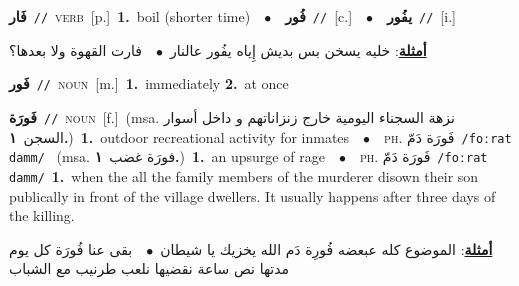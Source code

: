 \documentclass[10pt,a4paper,twoside]{article} %
\begin{document}
\begin{multicols}{2}
{\setlength\topsep{0pt}\textbf{\foreignlanguage{arabic}{فَار}}\ {\color{gray}\texttt{//}\color{black}}\ \textsc{verb}\ [p.]\ \textbf{1.}~boil (shorter time)\ \ $\bullet$\ \ \setlength\topsep{0pt}\textbf{\foreignlanguage{arabic}{فُور}}\ {\color{gray}\texttt{//}\color{black}}\ [c.]\ \ $\bullet$\ \ \setlength\topsep{0pt}\textbf{\foreignlanguage{arabic}{يفُور}}\ {\color{gray}\texttt{//}\color{black}}\ [i.]\  \begin{flushright}\color{gray}\foreignlanguage{arabic}{\textbf{\underline{\foreignlanguage{arabic}{أمثلة}}}: خليه يسخن بس بديش إِياه يفُور عالنار\ $\bullet$\ \  فارت القهوة ولا بعدها؟}\end{flushright}\color{black}} \vspace{2mm}

{\setlength\topsep{0pt}\textbf{\foreignlanguage{arabic}{فَور}}\ {\color{gray}\texttt{//}\color{black}}\ \textsc{noun}\ [m.]\ \textbf{1.}~immediately  \textbf{2.}~at once\ } \vspace{2mm}

{\setlength\topsep{0pt}\textbf{\foreignlanguage{arabic}{فَورَة}}\ {\color{gray}\texttt{//}\color{black}}\ \textsc{noun}\ [f.]\ \color{gray}(msa. \foreignlanguage{arabic}{نزهة السجناء اليومية خارج زنزاناتهم و داخل أسوار السجن}~\foreignlanguage{arabic}{\textbf{١.}})\color{black}\ \textbf{1.}~outdoor recreational activity for inmates\ \ $\bullet$\ \ \textsc{ph.} \color{gray} \foreignlanguage{arabic}{فَورَة دَمّ}\color{black}\ {\color{gray}\texttt{/{\sffamily foːrat damm}/}\color{black}}\ \color{gray} (msa. \foreignlanguage{arabic}{فورَة غضب}~\foreignlanguage{arabic}{\textbf{١.}})\color{black}\ \textbf{1.}~an upsurge of rage\ \ $\bullet$\ \ \textsc{ph.} \color{gray} \foreignlanguage{arabic}{فَورَة دَمّ}\color{black}\ {\color{gray}\texttt{/{\sffamily foːrat damm}/}\color{black}}\ \textbf{1.}~when the all the family members of the murderer disown their son publically in front of the village dwellers. It usually happens after three days of the killing.\  \begin{flushright}\color{gray}\foreignlanguage{arabic}{\textbf{\underline{\foreignlanguage{arabic}{أمثلة}}}: الموضوع كله عبعضه فُورِة دَم الله يخزيك يا شيطان\ $\bullet$\ \  بقى عنا فُورَة كل يوم مدتها نص ساعة نقضيها نلعب طرنيب مع الشباب}\end{flushright}\color{black}} \vspace{2mm}


\end{multicols}
\end{document}
